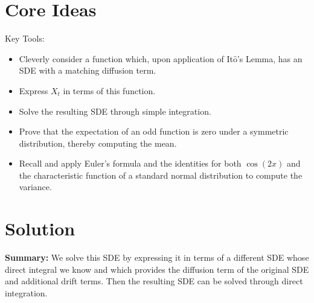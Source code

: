 \documentclass[12pt]{article}
\newcommand{\Itos}{It$\hat{\text{o}}$'s }
\begin{document}
\section*{Core Ideas}
Key Tools:
\begin{itemize}
    \item Cleverly consider a function which, upon application of \Itos Lemma, has an SDE with a matching diffusion term.
    \item Express $X_t$ in terms of this function.
    \item Solve the resulting SDE through simple integration.
    \item Prove that the expectation of an odd function is zero under a symmetric distribution, thereby computing the mean.
    \item Recall and apply Euler's formula and the identities for both $\cos(2x)$ and the characteristic function of a standard normal distribution to compute the variance.
\end{itemize}

\bigskip

\section*{Solution}
\textbf{Summary:} We solve this SDE by expressing it in terms of a different SDE whose direct integral we know and which provides the diffusion term of the original SDE and additional drift terms. Then the resulting SDE can be solved through direct integration.
\end{document}
